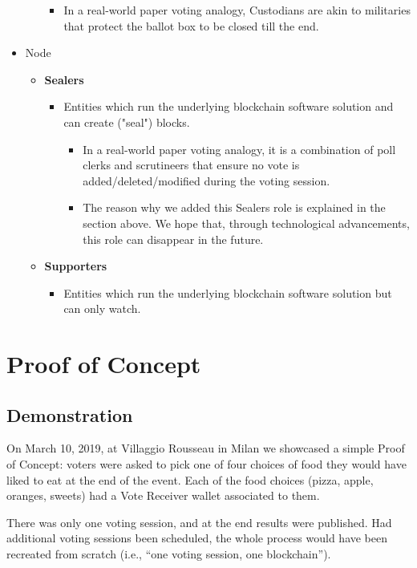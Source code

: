 \documentclass[10pt, letterpaper]{article}
\begin{document}
\begin{itemize}
\begin{itemize}
\begin{itemize}
\item In a real-world paper voting analogy, Custodians are akin to militaries that protect the ballot box to be closed till the end.
\end{itemize}
\end{itemize}
\item Node
\begin{itemize}
\item \textbf{Sealers}
\begin{itemize}
\item Entities which run the underlying blockchain software solution and can create ("seal") blocks.
\begin{itemize}
\item In a real-world paper voting analogy, it is a combination of poll clerks and scrutineers that ensure no vote is added/deleted/modified during the voting session.
\item The reason why we added this Sealers role is explained in the section above. We hope that, through technological advancements, this role can disappear in the future.
\end{itemize}
\end{itemize}
\item \textbf{Supporters}
\begin{itemize}
\item Entities which run the underlying blockchain software solution but can only watch.
\end{itemize}
\end{itemize}
\end{itemize}

\section{Proof of Concept}
\subsection{Demonstration}
On March 10, 2019, at Villaggio Rousseau in Milan we showcased a simple Proof of Concept: voters were asked to pick one of four choices of food they would have liked to eat at the end of the event. Each of the food choices (pizza, apple, oranges, sweets) had a Vote Receiver wallet associated to them.
\bigskip

There was only one voting session, and at the end results were published. 
Had additional voting sessions been scheduled, the whole process would have been recreated from scratch (i.e., “one voting session, one blockchain”).
\end{document}

